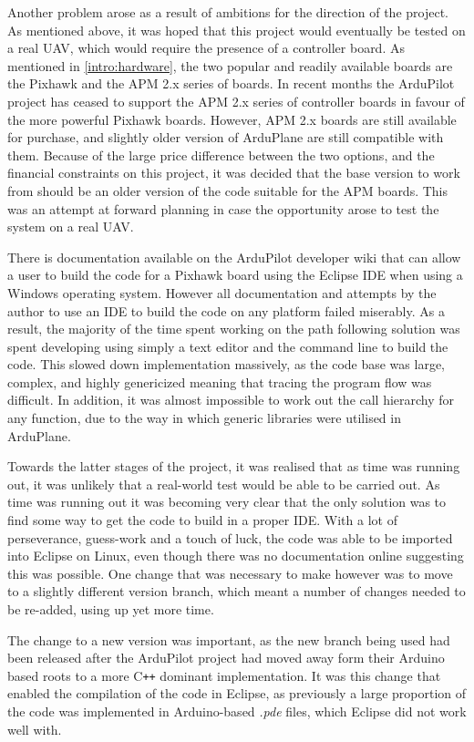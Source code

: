 Another problem arose as a result of ambitions for the direction of the project. As mentioned above, it was hoped that this project would eventually be tested on a real UAV, which would require the presence of a controller board. As mentioned in \ref{intro:hardware}, the two popular and readily available boards are the Pixhawk and the APM 2.x series of boards. In recent months the ArduPilot project has ceased to support the APM 2.x series of controller boards in favour of the more powerful Pixhawk boards. However, APM 2.x boards are still available for purchase, and slightly older version of ArduPlane are still compatible with them. Because of the large price difference between the two options, and the financial constraints on this project, it was decided that the base version to work from should be an older version of the code suitable for the APM boards. This was an attempt at forward planning in case the opportunity arose to test the system on a real UAV. 

There is documentation available on the ArduPilot developer wiki that can allow a user to build the code for a Pixhawk board using the Eclipse IDE when using a Windows operating system. However all documentation and attempts by the author to use an IDE to build the code on any platform failed miserably. As a result, the majority of the time spent working on the path following solution was spent developing using simply a text editor and the command line to build the code. This slowed down implementation massively, as the code base was large, complex, and highly genericized meaning that tracing the program flow was difficult. In addition, it was almost impossible to work out the call hierarchy for any function, due to the way in which generic libraries were utilised in ArduPlane.

Towards the latter stages of the project, it was realised that as time was running out, it was unlikely that a real-world test would be able to be carried out. As time was running out it was becoming very clear that the only solution was to find some way to get the code to build in a proper IDE. With a lot of perseverance, guess-work and a touch of luck, the code was able to be imported into Eclipse on Linux, even though there was no documentation online suggesting this was possible. One change that was necessary to make however was to move to a slightly different version branch, which meant a number of changes needed to be re-added, using up yet more time. 

The change to a new version was important, as the new branch being used had been released after the ArduPilot project had moved away form their Arduino based roots to a more C\texttt{++} dominant implementation. It was this change that enabled the compilation of the code in Eclipse, as previously a large proportion of the code was implemented in Arduino-based \textit{.pde} files, which Eclipse did not work well with.

